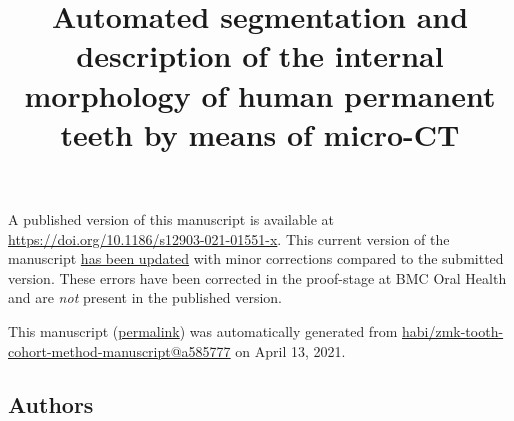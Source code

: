 \documentclass[
  american,
]{article}
\title{Automated segmentation and description of the internal morphology of human permanent teeth by means of micro-CT}
\author{}
\date{}
\begin{document}
\maketitle

A published version of this manuscript is available at \url{https://doi.org/10.1186/s12903-021-01551-x}.
This current version of the manuscript \href{https://github.com/habi/zmk-tooth-cohort-method-manuscript/compare/6d0a6402c44cb9745875171d2d33c37b4d7fe4be...a58577793380052c7fdf515ff2a5360b9e525391}{has been updated} with minor corrections compared to the submitted version.
These errors have been corrected in the proof-stage at BMC Oral Health and are \emph{not} present in the published version.

This manuscript
(\href{https://habi.github.io/zmk-tooth-cohort-method-manuscript/v/a58577793380052c7fdf515ff2a5360b9e525391/}{permalink})
was automatically generated
from \href{https://github.com/habi/zmk-tooth-cohort-method-manuscript/tree/a58577793380052c7fdf515ff2a5360b9e525391}{habi/zmk-tooth-cohort-method-manuscript@a585777}
on April 13, 2021.

\hypertarget{authors}{%
\subsection{Authors}\label{authors}}
\end{document}
